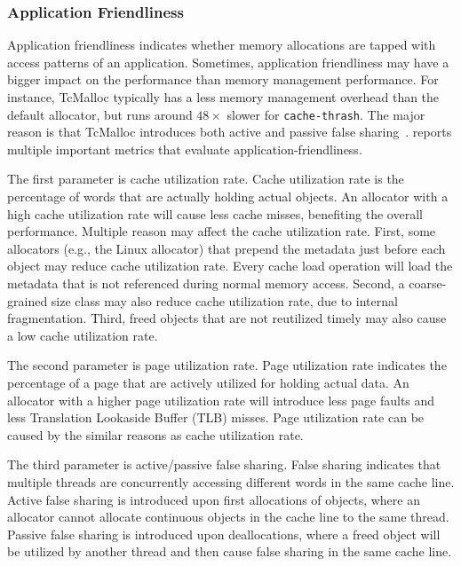 \subsubsection{Application Friendliness}
\label{sec: friendliness}

Application friendliness indicates whether memory allocations are tapped with access patterns of an application. Sometimes, application friendliness may have a bigger impact on the performance than memory management performance. For instance, TcMalloc typically has a less memory management overhead than the default allocator, but runs around $48\times$ slower  for \texttt{cache-thrash}. The major reason is that TcMalloc introduces both active and passive false sharing~\cite{tcmallocsharing}. \MP{} reports multiple important metrics that evaluate application-friendliness. 


The first parameter is cache utilization rate. Cache utilization rate is the percentage of words that are actually holding actual objects. An allocator with a high cache utilization rate will cause less cache misses, benefiting the overall performance. Multiple reason may affect the cache utilization rate. First, some allocators (e.g., the Linux allocator) that prepend the metadata just before each object may reduce  cache utilization rate. Every cache load operation will load the metadata that is not referenced during normal memory access. 
 Second, a coarse-grained size class may also reduce cache utilization rate, due to internal fragmentation. Third, freed objects that are not reutilized timely may also cause a low cache utilization rate. 


The second parameter is page utilization rate. Page utilization rate indicates the percentage of a page that are actively utilized for holding actual data. An allocator with a higher page utilization rate will introduce less page faults and less Translation Lookaside Buffer (TLB) misses. Page utilization rate can be caused by the similar reasons as cache utilization rate.  

The third parameter is active/passive false sharing. False sharing indicates that multiple threads are concurrently accessing different words in the same cache line. Active false sharing is introduced upon first allocations of objects, where an allocator cannot allocate continuous objects in the cache line to the same thread. Passive false sharing is introduced upon deallocations, where a freed object will be utilized by another thread and then cause false sharing in the same cache line. 

